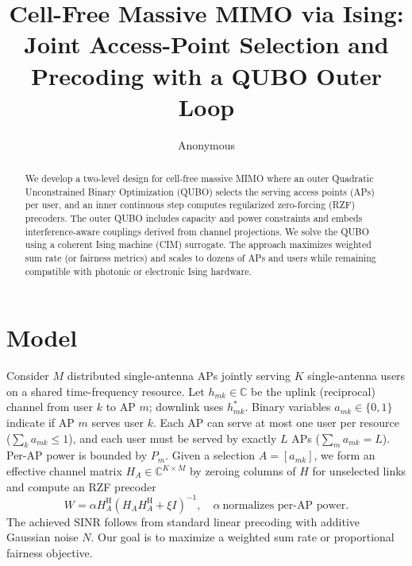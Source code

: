 \documentclass[10pt,conference]{IEEEtran}
\newcommand{\1}{\mathbf{1}}
\begin{document}
\title{Cell-Free Massive MIMO via Ising: Joint Access-Point Selection and Precoding with a QUBO Outer Loop}
\author{Anonymous}
\maketitle

\begin{abstract}
We develop a two-level design for cell-free massive MIMO where an outer Quadratic Unconstrained Binary Optimization (QUBO)
selects the serving access points (APs) per user, and an inner continuous step computes regularized zero-forcing (RZF) precoders.
The outer QUBO includes capacity and power constraints and embeds interference-aware couplings derived from channel projections.
We solve the QUBO using a coherent Ising machine (CIM) surrogate. The approach maximizes weighted sum rate (or fairness metrics)
and scales to dozens of APs and users while remaining compatible with photonic or electronic Ising hardware.
\end{abstract}

\section{Model}
Consider $M$ distributed single-antenna APs jointly serving $K$ single-antenna users on a shared time-frequency resource.
Let $h_{mk}\!\in\!\mathbb{C}$ be the uplink (reciprocal) channel from user $k$ to AP $m$; downlink uses $h_{mk}^\ast$.
Binary variables $a_{mk}\in\{0,1\}$ indicate if AP $m$ serves user $k$. Each AP can serve at most one user per resource ($\sum_k a_{mk}\le 1$),
and each user must be served by exactly $L$ APs ($\sum_m a_{mk}=L$).
Per-AP power is bounded by $P_m$.
Given a selection $A=[a_{mk}]$, we form an effective channel matrix $H_A \in \mathbb{C}^{K\times M}$ by zeroing columns of $H$ for unselected links
and compute an RZF precoder
\begin{equation}
W = \alpha H_A^\mathrm{H}(H_A H_A^\mathrm{H} + \xi I)^{-1}, \quad \alpha ~\text{normalizes per-AP power}.
\end{equation}
The achieved SINR follows from standard linear precoding with additive Gaussian noise $N$.
Our goal is to maximize a weighted sum rate or proportional fairness objective.
\end{document}
